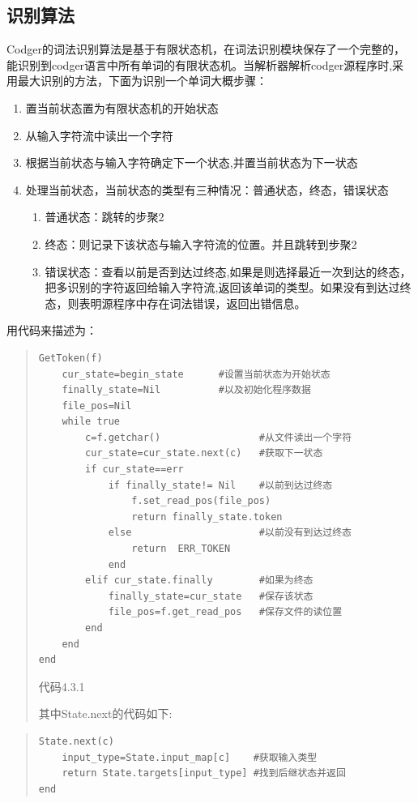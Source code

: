 \subsection{识别算法}
Codger的词法识别算法是基于有限状态机，在词法识别模块保存了一个完整的，能识别到codger语言中所有单词的有限状态机。当解析器解析codger源程序时,采用最大识别的方法，下面为识别一个单词大概步骤：
\begin{enumerate}
 \item 置当前状态置为有限状态机的开始状态
 \item 从输入字符流中读出一个字符
 \item 根据当前状态与输入字符确定下一个状态,并置当前状态为下一状态
 \item 处理当前状态，当前状态的类型有三种情况：普通状态，终态，错误状态
 \begin{enumerate}
 	\item 普通状态：跳转的步聚2
 	\item 终态：则记录下该状态与输入字符流的位置。并且跳转到步聚2
 	\item 错误状态：查看以前是否到达过终态,如果是则选择最近一次到达的终态，把多识别的字符返回给输入字符流,返回该单词的类型。如果没有到达过终态，则表明源程序中存在词法错误，返回出错信息。
 \end{enumerate}
\end{enumerate}
用代码来描述为：
\begin{quote}
\begin{verbatim}
GetToken(f)                    
    cur_state=begin_state      #设置当前状态为开始状态
    finally_state=Nil          #以及初始化程序数据
    file_pos=Nil
    while true 
        c=f.getchar()                 #从文件读出一个字符
        cur_state=cur_state.next(c)   #获取下一状态
        if cur_state==err         
            if finally_state!= Nil    #以前到达过终态
                f.set_read_pos(file_pos)  
                return finally_state.token  
            else                      #以前没有到达过终态
                return  ERR_TOKEN  
            end
        elif cur_state.finally        #如果为终态
            finally_state=cur_state   #保存该状态
            file_pos=f.get_read_pos   #保存文件的读位置
        end
    end
end 
\end{verbatim}
\begin{center}
 代码4.3.1
\end{center}
其中State.next的代码如下:
\end{quote}
\begin{quote}
\begin{verbatim}
State.next(c)
    input_type=State.input_map[c]    #获取输入类型
    return State.targets[input_type] #找到后继状态并返回
end 
\end{verbatim}
\end{quote}

